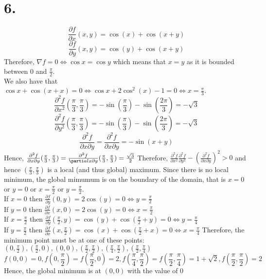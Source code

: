 \documentclass[11pt]{article}
\begin{document}
\section*{6.}
\[
\frac{\partial f}{\partial x}(x,y) = \cos(x) + \cos(x+y)
\]
\[
\frac{\partial f}{\partial y}(x,y) = \cos(y) + \cos(x+y)
\]
Therefore, $\nabla f = 0 \iff \cos x = \cos y$ which means that $x=y$ as it is bounded between $0$ and $\frac{\pi}{2}$. \\
We also have that $\cos x + \cos (x+x) = 0 \iff \cos x + 2\cos^2(x) -  1 = 0 \iff x = \frac{\pi}{3}$. 
\[
\frac{\partial^2 f}{\partial x^2}(\frac{\pi}{3},\frac{\pi}{3}) = -\sin(\frac{\pi}{3}) - \sin(\frac{2\pi}{3}) = -\sqrt{3}
\]
\[
\frac{\partial^2 f}{\partial y^2}(\frac{\pi}{3},\frac{\pi}{3}) = -\sin(\frac{\pi}{3}) - \sin(\frac{2\pi}{3}) = -\sqrt{3}
\]
\[
\frac{\partial^2 f}{\partial x \partial y} = \frac{\partial^2 f}{\partial x \partial y} = -\sin(x+y)
\]
Hence, $\frac{\partial^2 f }{\partial x \partial y} (\frac{\pi}{3}, \frac{\pi}{3}) = \frac{\partial^2 f}{\parti al x \partial y} (\frac{\pi}{3}, \frac{\pi}{3}) =  \frac{\sqrt{3}}{2}$
Therefore, $\frac{\partial^2 f }{\partial x^2} \frac{\partial^2 f }{\partial y^2}-\left(\frac{\partial^2 f }{\partial x \partial y} \right)^2 > 0$ and hence $(\frac{\pi}{3}, \frac{\pi}{3})$ is a local (and thus global) maximum. 
Since there is no local minimum, the global mimumum is on the boundary of the domain, that is $x=0$ or 
$y=0$ or $x = \frac{\pi}{2}$ or $y = \frac{\pi}{2}$. \\
If $x=0$ then $\frac{\partial f}{\partial y}(0,y) = 2\cos(y) = 0 \iff y = \frac{\pi}{2}$
\\
If $y=0$ then $\frac{\partial f}{\partial x}(x,0) = 2\cos(y) = 0 \iff x = \frac{\pi}{2}$
\\
If $x = \frac{\pi}{2}$ then $\frac{\partial f}{\partial y}(\frac{\pi}{2},y) = \cos(y) + \cos(\frac{\pi}{2} + y) = 0 \iff y = \frac{\pi}{4}$
\\
If $y = \frac{\pi}{2}$ then $\frac{\partial f}{\partial x}(x,\frac{\pi}{2}) = \cos(x) + \cos(\frac{\pi}{2} + x) = 0 \iff x = \frac{\pi}{4}$
Therefore, the minimum point must be at one of these points: $(0, \frac{\pi}{2}), (\frac{\pi}{2},0), (0,0), (\frac{\pi}{2}, \frac{\pi}{2}), (\frac{\pi}{4}, \frac{\pi}{2}), (\frac{\pi}{2}, \frac{\pi}{4})$
\[
f\left(0,0\right) = 0, f\left(0,\frac{\pi}{2}\right) = f\left(\frac{\pi}{2},0\right) = 2, f\left(\frac{\pi}{4}, \frac{\pi}{2}\right) = f\left(\frac{\pi}{2}, \frac{\pi}{4}\right) = 1 + \sqrt{2}, f\left(\frac{\pi}{2}, \frac{\pi}{2}\right) = 2
\]
Hence, the global minimum is at $\left(0, 0\right)$ with the value of 0    
\end{document}
